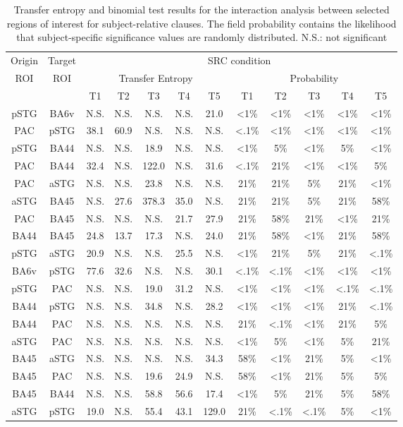 \vspace{5mm}

\begin{table}[h]
\begin{center}
\begin{tabular}{cccccccccccc}
Origin & Target & \multicolumn{10}{c}{SRC condition}\\
ROI & ROI & \multicolumn{5}{c}{Transfer Entropy} & \multicolumn{5}{c}{Probability}\\
 & & T1 & T2 & T3 & T4 & \multicolumn{1}{c|}{T5} & T1 & T2 & T3 & T4 & T5\\ \hline
pSTG & BA6v & N.S. & N.S. & N.S. & N.S. & 21.0 & <1\% & <1\% & <1\% & <1\% & <1\%\\ 
PAC & pSTG & 38.1 & 60.9 & N.S. & N.S. & N.S. & <.1\% & <1\% & <1\% & <1\% & <1\%\\ 
pSTG & BA44 & N.S. & N.S. & 18.9 & N.S. & N.S. & <1\% & 5\% & <1\% & 5\% & <1\%\\ 
PAC & BA44 & 32.4 & N.S. & 122.0 & N.S. & 31.6 & <.1\% & 21\% & <1\% & <1\% & 5\%\\ 
PAC & aSTG & N.S. & N.S. & 23.8 & N.S. & N.S. & 21\% & 21\% & 5\% & 21\% & <1\%\\ 
aSTG & BA45 & N.S. & 27.6 & 378.3 & 35.0 & N.S. & 21\% & 21\% & 5\% & 21\% & 58\%\\ 
PAC & BA45 & N.S. & N.S. & N.S. & 21.7 & 27.9 & 21\% & 58\% & 21\% & <1\% & 21\%\\ 
BA44 & BA45 & 24.8 & 13.7 & 17.3 & N.S. & 24.0 & 21\% & 58\% & <1\% & 21\% & 58\%\\ 
pSTG & aSTG & 20.9 & N.S. & N.S. & 25.5 & N.S. & <1\% & 21\% & 5\% & 21\% & <.1\%\\ 
BA6v & pSTG & 77.6 & 32.6 & N.S. & N.S. & 30.1 & <.1\% & <.1\% & <1\% & <1\% & <1\%\\ 
pSTG & PAC & N.S. & N.S. & 19.0 & 31.2 & N.S. & <1\% & <1\% & <1\% & <.1\% & <.1\%\\ 
BA44 & pSTG & N.S. & N.S. & 34.8 & N.S. & 28.2 & <1\% & <1\% & <1\% & 21\% & <.1\%\\ 
BA44 & PAC & N.S. & N.S. & N.S. & N.S. & N.S. & 21\% & <.1\% & <1\% & 21\% & 5\%\\ 
aSTG & PAC & N.S. & N.S. & N.S. & N.S. & N.S. & <1\% & 5\% & <1\% & 5\% & 21\%\\ 
BA45 & aSTG & N.S. & N.S. & N.S. & N.S. & 34.3 & 58\% & <1\% & 21\% & 5\% & <1\%\\ 
BA45 & PAC & N.S. & N.S. & 19.6 & 24.9 & N.S. & 58\% & <1\% & 21\% & 5\% & 5\%\\ 
BA45 & BA44 & N.S. & N.S. & 58.8 & 56.6 & 17.4 & <1\% & 5\% & 21\% & 5\% & 58\%\\ 
aSTG & pSTG & 19.0 & N.S. & 55.4 & 43.1 & 129.0 & 21\% & <.1\% & <.1\% & 5\% & <1\%\\ 
\end{tabular}
\caption{\label{4.4.TEvalues.b} Transfer entropy and binomial test results for the interaction analysis between selected regions of interest for subject-relative clauses. The field probability contains the likelihood that subject-specific significance values are randomly distributed. N.S.: not significant}
\end{center}
\end{table}
